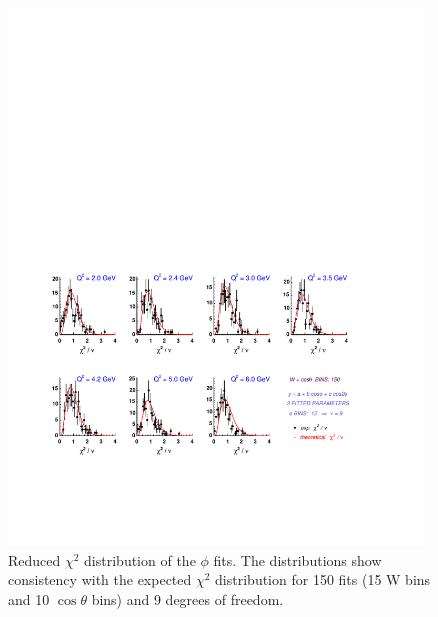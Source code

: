 \begin{figure}[h]
 \includegraphics[width = 11cm, bb=50 110 380 400]{analysis/img/chi2_ctr} 
  \caption[Reduced $\chi^2$ distribution of the $\phi$ fits]
          { Reduced $\chi^2$ distribution of the $\phi$ fits. The distributions
	             show consistency with the expected  $\chi^2$ distribution for 150 fits
		     (15 W bins and 10 $\cos\theta$ bins) and 9 degrees of freedom.}
 \label{fig:chi2_ctr}
\end{figure}




